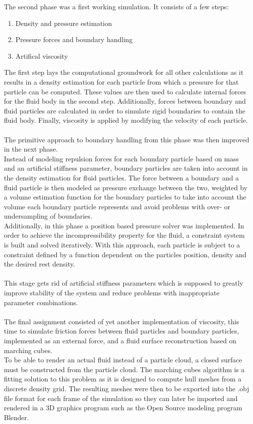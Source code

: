\documentclass{ACGSeminar}
\begin{document}
The second phase was a first working simulation. It consists of a few steps:\\
\begin{enumerate}
\item Density and pressure estimation
\item Pressure forces and boundary handling
\item Artifical viscosity
\end{enumerate}
The first step lays the computational groundwork for all other calculations as it results in a density estimation for each particle from which a pressure for that particle can be computed.
These values are then used to calculate internal forces for the fluid body in the second step. Additionally, forces between boundary and fluid particles are calculated in order to simulate rigid boundaries to contain the fluid body.
Finally, viscosity is applied by modifying the velocity of each particle.\\
\\
The primitive approach to boundary handling from this phase was then improved in the next phase. \\
Instead of modeling repulsion forces for each boundary particle based on mass and an artificial stiffness parameter, boundary particles are taken into account in the density estimation for fluid particles. The force between a boundary and a fluid particle is then modeled as pressure exchange between the two, weighted by a volume estimation function for the boundary particles to take into account the volume each boundary particle represents and avoid problems with over- or undersampling of boundaries. \\
Additionally, in this phase a position based pressure solver was implemented. In order to achieve the incompressibility property for the fluid, a constraint system is built and solved iteratively. With this approach, each particle is subject to a constraint defined by a function dependent on the particles position, density and the desired rest density.\\
\\
This stage gets rid of artificial stiffness parameters which is supposed to greatly improve stability of the system and reduce problems with inappropriate parameter combinations.  \\
\\
The final assignment consisted of yet another implementation of viscosity, this time to simulate friction forces between fluid particles and boundary particles, implemented as an external force, and a fluid surface reconstruction based on marching cubes. \\
To be able to render an actual fluid instead of a particle cloud, a closed surface must be constructed from the particle cloud. The marching cubes algorithm is a fitting solution to this problem as it is designed to compute hull meshes from a discrete density grid.
The resulting meshes were then to be exported into the .obj file format for each frame of the simulation so they can later be imported and rendered in a 3D graphics program such as the Open Source modeling program Blender.\\
\\
\end{document}
